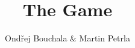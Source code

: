 \documentclass[a4paper]{article}
\begin{document}
\title{The Game}
\author{Ondřej Bouchala & Martin Petrla}
\maketitle
\newpage
\tableofcontents
\newpage
\noindent



\end{document}
